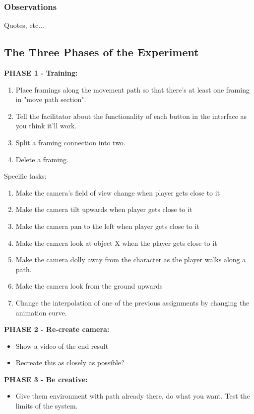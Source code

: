 \subsubsection{Observations}
Quotes, etc...

\subsection{The Three Phases of the Experiment}
\textbf{PHASE 1 - Training:}
\begin{enumerate}
\item Place framings along the movement path so that there's at least one framing in "move path section".
\item Tell the facilitator about the functionality of each button in the interface as you think it'll work.
\item Split a framing connection into two.
\item Delete a framing.
\end{enumerate}

Specific tasks:
\begin{enumerate}
\item Make the camera's field of view change when player gets close to it
\item Make the camera tilt upwards when player gets close to it
\item Make the camera pan to the left when player gets close to it
\item Make the camera look at object X when the player gets close to it
\item Make the camera dolly away from the character as the player walks along a path.
\item Make the camera look from the ground upwards
\item Change the interpolation of one of the previous assignments by changing the animation curve.
\end{enumerate}

\textbf{PHASE 2 - Re-create camera:}
\begin{itemize}
\item Show a video of the end result
\item Recreate this as closely as possible?
\end{itemize}

\textbf{PHASE 3 - Be creative:}
\begin{itemize}
\item Give them environment with path already there, do what you want. Test the limits of the system.
\end{itemize}
